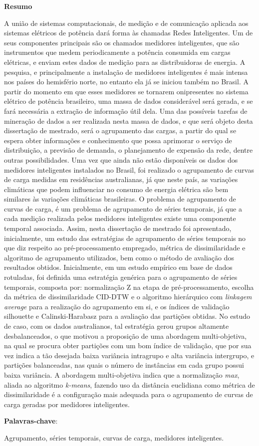 \begin{center}
  \large{\textbf{Resumo}}
\end{center}

A união de sistemas computacionais, de medição e de comunicação aplicada aos sistemas elétricos de potência dará forma às chamadas Redes Inteligentes. Um de seus componentes principais são os chamados medidores inteligentes, que são instrumentos que medem periodicamente a potência consumida em cargas elétricas, e enviam estes dados de medição para as distribuidoras de energia. A pesquisa, e principalmente a instalação de medidores inteligentes é mais intensa nos países do hemisfério norte, no entanto ela já se iniciou também no Brasil. A partir do momento em que esses medidores se tornarem onipresentes no sistema elétrico de potência brasileiro, uma massa de dados considerável será gerada, e se fará necessária a extração de informação útil dela. Uma das possíveis tarefas de mineração de dados a ser realizada nesta massa de dados, e que será objeto desta dissertação de mestrado, será o agrupamento das cargas, a partir do qual se espera obter informações e conhecimento que possa aprimorar o serviço de distribuição, a previsão de demanda, o planejamento de expensão da rede, dentre outras possibilidades. Uma vez que ainda não estão disponíveis os dados dos medidores inteligentes instalados no Brasil, foi realizado o agrupamento de curvas de carga medidas em residências australianas, já que neste país, as variações climáticas que podem influenciar no consumo de energia elétrica são bem similares às variações climáticas brasileiras. O problema de agrupamento de curvas de carga, é um problema de agrupamento de séries temporais, já que a cada medição realizada pelos medidores inteligentes existe uma componente temporal associada. Assim, nesta dissertação de mestrado foi apresentado, inicialmente, um estudo das estratégias de agrupamento de séries temporais no que diz respeito ao pré-processamento empregado, métrica de dissimilaridade e algoritmo de agrupamento utilizados, bem como o método de avaliação dos resultados obtidos. Inicialmente, em um estudo empírico em base de dados rotuladas, foi definida uma estratégia genérica para o agrupamento de séries temporais, composta por: normalização Z na etapa de pré-processamento, escolha da métrica de dissimilaridade CID-DTW e o algoritmo hierárquico com \emph{linkagem average} para a realização do agrupamento em si, e os índices de validação silhouette e Calinski-Harabasz para a avaliação das partições obtidas. No estudo de caso, com os dados australianos, tal estratégia gerou grupos altamente desbalanceados, o que motivou a proposição de uma abordagem multi-objetiva, na qual se procura obter partições com um bom índice de validação, que por sua vez indica a tão desejada baixa variância intragrupo e alta variância intergrupo, e partições balanceadas, nas quais o número de instâncias em cada grupo possui baixa variância. A abordagem multi-objetiva indica que a normalização \emph{max}, aliada ao algoritmo \emph{k-means}, fazendo uso da distância euclidiana como métrica de dissimilaridade é a configuração mais adequada para o agrupamento de curvas de carga geradas por medidores inteligentes.

\vspace{.2cm}
\textbf{Palavras-chave}:

Agrupamento, séries temporais, curvas de carga, medidores inteligentes.
